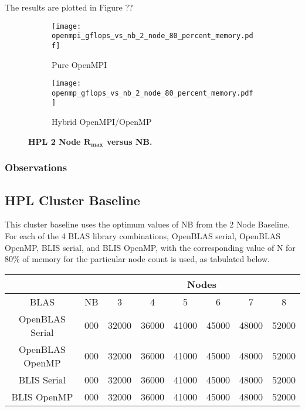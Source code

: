 The results are plotted in Figure ??

\begin{figure}[H]
	\begin{subfigure}{1.0\textwidth}
		\centering
		\texttt{[image: openmpi\_gflops\_vs\_nb\_2\_node\_80\_percent\_memory.pdf]}
		\caption{Pure OpenMPI}
		\label{fig:subim1}
	\end{subfigure}
	\par\bigskip
	\begin{subfigure}{1.0\textwidth}
		\centering
		\texttt{[image: openmp\_gflops\_vs\_nb\_2\_node\_80\_percent\_memory.pdf]}
		\caption{Hybrid OpenMPI/OpenMP}
		\label{fig:subim2}
	\end{subfigure}
\caption{\textbf{HPL 2 Node $\mathbf{R_{max}}$ versus NB.}}
\label{fig:image2}
\end{figure}



%
%
\subsubsection{Observations}




%
%
\subsection{HPL Cluster Baseline}

This cluster baseline uses the optimum values of NB from the 2 Node Baseline. For each of the 4 BLAS library combinations, OpenBLAS serial, OpenBLAS OpenMP, BLIS serial, and BLIS OpenMP, with the corresponding value of N for 80\% of memory for the particular node count is used, as tabulated below.

\begin{center}
	\begin{tabular}{ |c|c|c|c|c|c|c|c| } 
		\hline
		\multicolumn{2}{|c|}{} & \multicolumn{6}{c|}{Nodes} \\
		\hline
		BLAS & NB & 3 & 4 & 5 & 6 & 7 & 8 \\ 
		\hline
		OpenBLAS Serial & 000 & 32000 & 36000 & 41000 & 45000 & 48000 & 52000 \\ 
		OpenBLAS OpenMP & 000 & 32000 & 36000 & 41000 & 45000 & 48000 & 52000 \\ 
 		BLIS Serial     & 000 & 32000 & 36000 & 41000 & 45000 & 48000 & 52000 \\
		BLIS OpenMP     & 000 & 32000 & 36000 & 41000 & 45000 & 48000 & 52000 \\ 
 		\hline
	\end{tabular}
\end{center}


